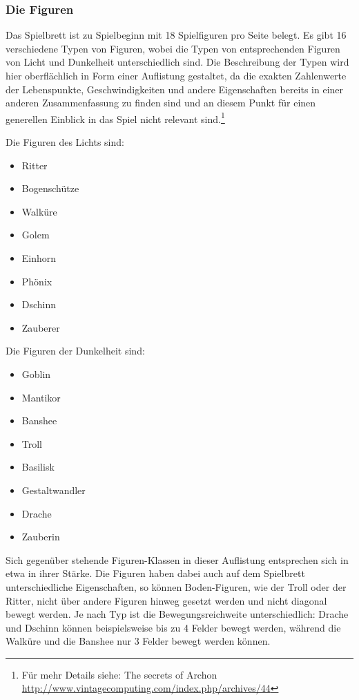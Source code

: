 \subsubsection{Die Figuren}
Das Spielbrett ist zu Spielbeginn mit 18 Spielfiguren pro Seite belegt. Es gibt 16 verschiedene Typen von Figuren, wobei die Typen von entsprechenden Figuren von Licht und Dunkelheit unterschiedlich sind. Die Beschreibung der Typen wird hier oberflächlich in Form einer Auflistung gestaltet, da die exakten Zahlenwerte der Lebenspunkte, Geschwindigkeiten und andere Eigenschaften bereits in einer anderen Zusammenfassung zu finden sind und an diesem Punkt für einen generellen Einblick in das Spiel nicht relevant sind.\footnote{Für mehr Details siehe: The secrets of Archon \url{http://www.vintagecomputing.com/index.php/archives/44}}
\begin{multicols}{2}
	Die Figuren des Lichts sind: 
	\begin{itemize}
		\item Ritter
		\item Bogenschütze
		\item Walküre
		\item Golem
		\item Einhorn
		\item Phönix
		\item Dschinn
		\item Zauberer
	\end{itemize}
\columnbreak
	Die Figuren der Dunkelheit sind:
	\begin{itemize}
		\item Goblin
		\item Mantikor
		\item Banshee
		\item Troll
		\item Basilisk
		\item Gestaltwandler
		\item Drache
		\item Zauberin
	\end{itemize}
\end{multicols}
Sich gegenüber stehende Figuren-Klassen in dieser Auflistung entsprechen sich in etwa in ihrer Stärke. Die Figuren haben dabei auch auf dem Spielbrett unterschiedliche Eigenschaften, so können Boden-Figuren, wie der Troll oder der Ritter, nicht über andere Figuren hinweg gesetzt werden und nicht diagonal bewegt werden. Je nach Typ ist die Bewegungsreichweite unterschiedlich: Drache und Dschinn können beispielsweise bis zu 4 Felder bewegt werden, während die Walküre und die Banshee nur 3 Felder bewegt werden können.\\
